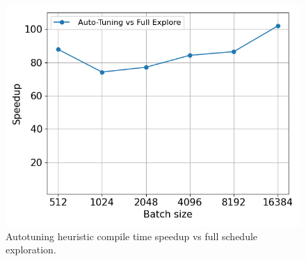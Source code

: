 \begin{figure}[htb]
  \centering
  \includegraphics[width=0.75\linewidth]{figures/geomean_speedup_4060_full_exp_vs_at.png}
  \caption{Autotuning heuristic compile time speedup vs full schedule exploration.}
  \label{Fig:HeuristicVsFullExplore_Speedup}
\end{figure}


